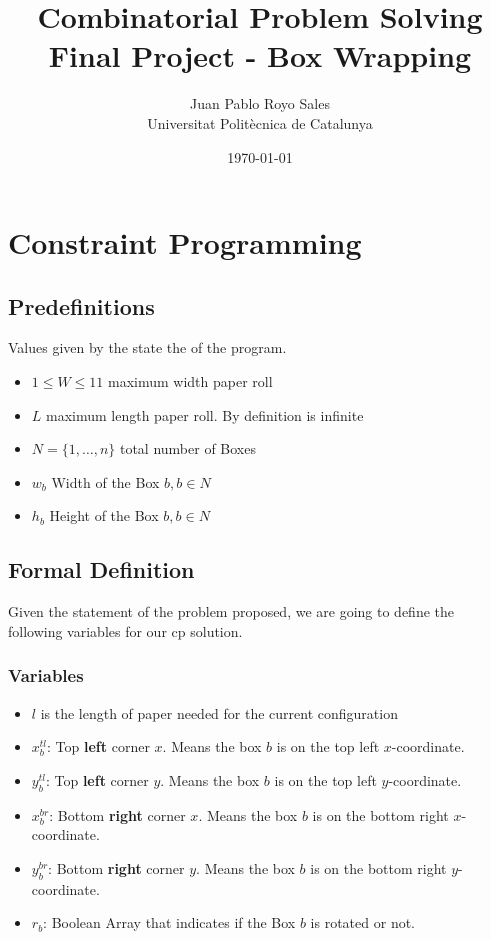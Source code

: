 \documentclass[12pt, a4paper]{article}
\title{%
      Combinatorial Problem Solving \\
      Final Project - Box Wrapping
}
\author{%
  Juan Pablo Royo Sales \\
  \small{Universitat Politècnica de Catalunya}
}
\date\today
\begin{document}
\maketitle

\section{Constraint Programming}

\subsection{Predefinitions}
Values given by the state the of the program.

\begin{itemize}
  \item $1 \leq W \leq 11$ maximum width paper roll
  \item $L$ maximum length paper roll. By definition is infinite
  \item $N = \{1, \dots, n\}$ total number of Boxes
  \item $w_b$ Width of the Box $b, b \in N$
  \item $h_b$ Height of the Box $b, b \in N$
\end{itemize}

\subsection{Formal Definition}
Given the statement of the problem proposed, we are going to define the following variables for our \acrfull{cp} solution.

\subsubsection{Variables}
\begin{itemize}
  \item $l$ is the length of paper needed for the current configuration
  \item $x_b^{tl}$: Top \textbf{left} corner $x$. Means the box $b$ is on the top left $x$-coordinate.
  \item $y_b^{tl}$: Top \textbf{left} corner $y$. Means the box $b$ is on the top left $y$-coordinate.
  \item $x_b^{br}$: Bottom \textbf{right} corner $x$. Means the box $b$ is on the bottom right $x$-coordinate.
  \item $y_b^{br}$: Bottom \textbf{right} corner $y$. Means the box $b$ is on the bottom right $y$-coordinate.
  \item $r_b$: Boolean Array that indicates if the Box $b$ is rotated or not.
\end{itemize}
\end{document}
